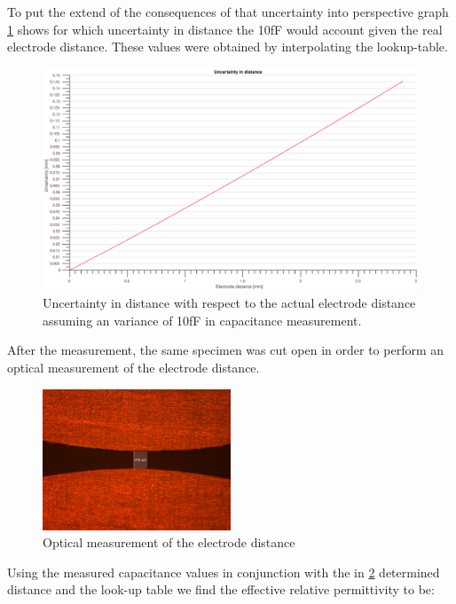 To put the extend of the consequences of that uncertainty into perspective graph \ref{fig.uncertainty}
shows for which uncertainty in distance the 10fF would account given the real electrode distance. These values were obtained by
interpolating the lookup-table.

\begin{figure}[h!tb]
\includegraphics[width=\textwidth]{figures/Results/Capacitance_Measure/uncertainty.eps}
\caption[Kurze Abbildungsbeschreibung]{Uncertainty in distance with respect to the
actual electrode distance assuming an variance of 10fF in capacitance measurement.}
\label{fig.uncertainty}
\end{figure}


After the measurement, the same specimen was cut open in order to perform an optical measurement of the electrode distance.


\begin{figure}[ht]
	\centering
	\includegraphics[width=0.5\textwidth]{figures/Results/Capacitance_Measure/Sample1_scale.jpg}		
	\caption[Kurze Abbildungsbeschreibung]{Optical measurement of the electrode distance \protect\footnotemark} 
	\label{fig.opticalmeasurement}
\end{figure}
Using the measured capacitance values in conjunction with the in \ref{fig.opticalmeasurement} determined distance and the look-up table
we find the effective relative permittivity to be:

